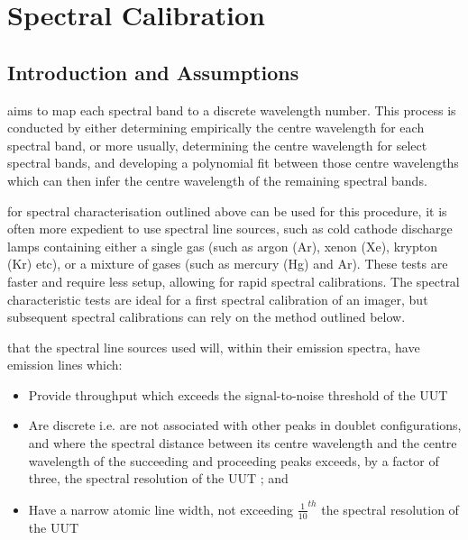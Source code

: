 \documentclass[nohyper,nobib]{tufte-book}
\begin{document}
\chapter{Spectral Calibration}
\label{ch:SpectralCalibration}

\section{Introduction and Assumptions}
 aims to map each spectral band to a discrete wavelength number. This process is conducted by either determining empirically the centre wavelength for each spectral band, or more usually, determining the centre wavelength for select spectral bands, and developing a polynomial fit between those centre wavelengths which can then infer the centre wavelength of the remaining spectral bands. 

 for spectral characterisation outlined above can be used for this procedure, it is often more expedient to use spectral line sources, such as cold cathode discharge lamps containing either a single gas (such as argon (Ar), xenon (Xe), krypton (Kr) etc), or a mixture of gases (such as mercury (Hg) and Ar). These tests are faster and require less setup, allowing for rapid spectral calibrations. The spectral characteristic tests are ideal for a first spectral calibration of an imager, but subsequent spectral calibrations can rely on the method outlined below. 

 that the spectral line sources used will, within their emission spectra, have emission lines which:
\begin{itemize}
	\item Provide throughput which exceeds the signal-to-noise threshold of the UUT
	\item Are discrete i.e. are not associated with other peaks in doublet configurations, and where the spectral distance between its centre wavelength and the centre wavelength of the succeeding and proceeding peaks exceeds, by a factor of three, the spectral resolution of the UUT ; and
	\item Have a narrow atomic line width, not exceeding  ${\frac{1}{10}}^{th}$ the spectral resolution of the UUT
\end{itemize}
\end{document}

